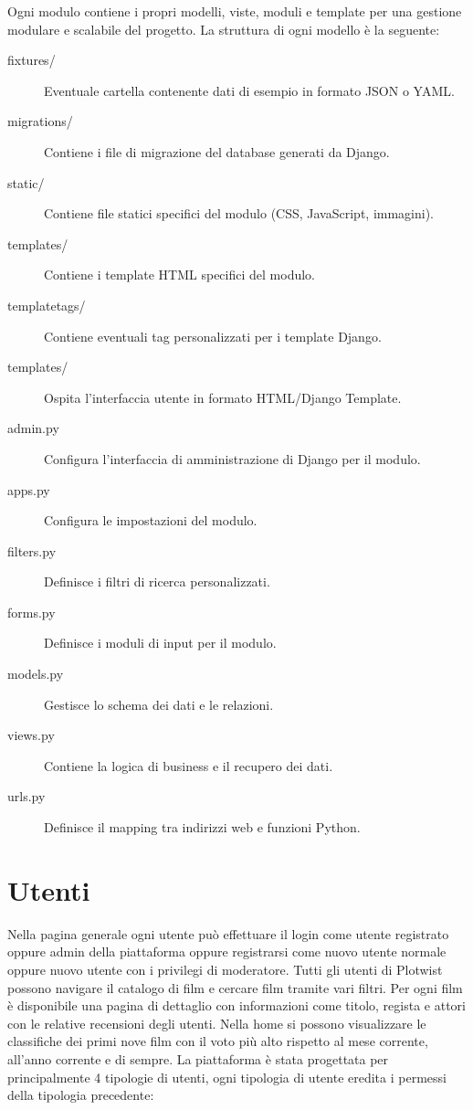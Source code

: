 \documentclass[12pt,a4paper]{report}
\begin{document}
Ogni modulo contiene i propri modelli, viste, moduli e template per una gestione modulare e scalabile del progetto.
La struttura di ogni modello è la seguente:
\begin{description}
    \item[fixtures/] Eventuale cartella contenente dati di esempio in formato JSON o YAML.
    \item[migrations/] Contiene i file di migrazione del database generati da Django.
    \item[static/] Contiene file statici specifici del modulo (CSS, JavaScript, immagini).
    \item[templates/] Contiene i template HTML specifici del modulo.
    \item[templatetags/] Contiene eventuali tag personalizzati per i template Django.
    \item[templates/] Ospita l'interfaccia utente in formato HTML/Django Template.
    \item[admin.py] Configura l'interfaccia di amministrazione di Django per il modulo.
    \item[apps.py] Configura le impostazioni del modulo.
    \item[filters.py] Definisce i filtri di ricerca personalizzati.
    \item[forms.py] Definisce i moduli di input per il modulo.
    \item[models.py] Gestisce lo schema dei dati e le relazioni.
    \item[views.py] Contiene la logica di business e il recupero dei dati.
    \item[urls.py] Definisce il mapping tra indirizzi web e funzioni Python.
\end{description}



\section{Utenti}
Nella pagina generale ogni utente può effettuare il login come utente registrato oppure admin della piattaforma oppure registrarsi come nuovo utente normale oppure nuovo utente con i privilegi di moderatore.
\newline
Tutti gli utenti di Plotwist possono navigare il catalogo di film e cercare film tramite vari filtri.
Per ogni film è disponibile una pagina di dettaglio con informazioni come titolo, regista e attori con le relative recensioni degli utenti.
\newline
Nella home si possono visualizzare le classifiche dei primi nove film con il voto più alto rispetto al mese corrente, all'anno corrente e di sempre.
\newline
\newline
La piattaforma è stata progettata per principalmente 4 tipologie di utenti, ogni tipologia di utente eredita i permessi della tipologia precedente:
\end{document}
